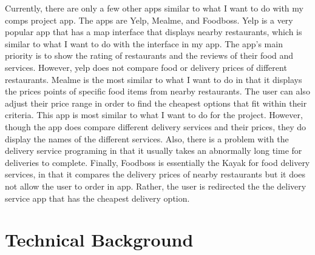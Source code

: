 \documentclass[10pt,twocolumn,letterpaper]{article}
\begin{document}
Currently, there are only a few other apps similar to what I want to do with my comps project app. The apps are Yelp, Mealme, and Foodboss. Yelp is a very popular app that has a map interface that displays nearby restaurants, which is similar to what I want to do with the interface in my app. The app’s main priority is to show the rating of restaurants and the reviews of their food and services. However, yelp does not compare food or delivery prices of different restaurants. Mealme is the most similar to what I want to do in that it displays the prices points of specific food items from nearby restaurants. The user can also adjust their price range in order to find the cheapest options that fit within their criteria. This app is most similar to what I want to do for the project. However, though the app does compare different delivery services and their prices, they do display the names of the different services. Also, there is a problem with the delivery service programing in that it usually takes an abnormally long time for deliveries to complete. Finally, Foodboss is essentially the Kayak for food delivery services, in that it compares the delivery prices of nearby restaurants but it does not allow the user to order in app. Rather, the user is redirected the the delivery service app that has the cheapest delivery option.

\section{Technical Background}
\label{sec:Technical Nackground}
\end{document}
